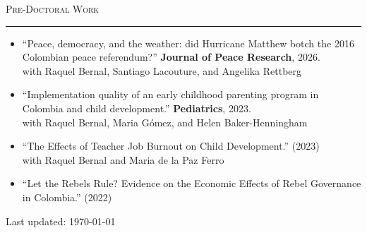 \documentclass[10pt, letterpaper]{article}
\newcommand{\cvsection}[1]{%
  \vspace{14pt}%
  {\color{accent}\large\scshape #1}%
  \par\vspace{-2pt}%
  {\color{accent}\rule{\linewidth}{1.5pt}}%
  \par\vspace{6pt}%
}
\begin{document}
\cvsection{Pre-Doctoral Work}

\begin{itemize}
  \item ``Peace, democracy, and the weather: did Hurricane Matthew botch the 2016 Colombian peace referendum?'' \textbf{Journal of Peace Research}, 2026.\\
  {\small\color{graytext} with Raquel Bernal, Santiago Lacouture, and Angelika Rettberg}

  \item ``Implementation quality of an early childhood parenting program in Colombia and child development.'' \textbf{Pediatrics}, 2023.\\
  {\small\color{graytext} with Raquel Bernal, Maria Gómez, and Helen Baker-Henningham}

  \item ``The Effects of Teacher Job Burnout on Child Development.'' (2023)\\
  {\small\color{graytext} with Raquel Bernal and Maria de la Paz Ferro}

  \item ``Let the Rebels Rule? Evidence on the Economic Effects of Rebel Governance in Colombia.'' (2022)
\end{itemize}

\vfill

\begin{center}
  {\footnotesize\color{graytext} Last updated: \today}
\end{center}
\end{document}
